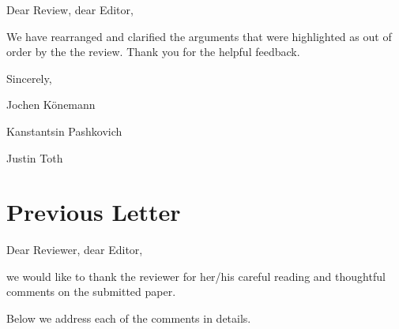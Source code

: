 \documentclass[11pt]{article}
\begin{document}
Dear Review, dear Editor,

\bigskip

We have rearranged and clarified the arguments that were highlighted as out of order by the the review. Thank you for the helpful feedback.

\smallskip

 Sincerely,

\smallskip

\qquad Jochen K\"{o}nemann

\qquad  Kanstantsin Pashkovich

\qquad  Justin Toth

\section*{Previous Letter}

Dear Reviewer, dear Editor,

\bigskip

we would like to thank the reviewer for her/his careful reading and thoughtful comments on the submitted paper. 

Below we address each of the comments in details.
\end{document}
